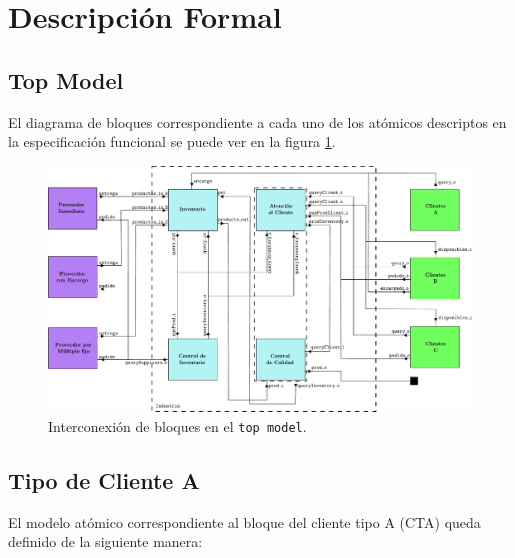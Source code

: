 \documentclass[10pt]{article}
\begin{document}
\section{Descripción Formal}

\subsection{Top Model\label{sec:TM}} 
El diagrama de bloques correspondiente a cada uno de los atómicos descriptos en la especificación funcional se puede ver en la figura \ref{fig:TM-esquematico}.  
 
\begin{figure}[h] 
  \centering 
  \includegraphics[angle=-90, width=\textwidth]{img/bloquestopmodel} 
  \caption{Interconexión de bloques en el \texttt{top model}.} 
  \label{fig:TM-esquematico} 
\end{figure}
\FloatBarrier

\subsection{Tipo de Cliente A\label{sec:CTA}}

El modelo atómico correspondiente al bloque del cliente tipo A (CTA) queda definido de la siguiente manera:

\\
\end{document}
